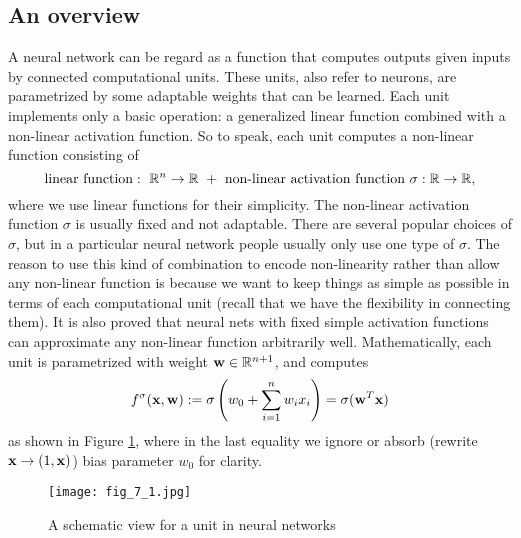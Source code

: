 \documentclass[../main.tex]{subfiles}
\begin{document}
\subsection{An overview}
A neural network can be regard as a function that computes outputs given inputs by connected computational units. These units, also refer to neurons, are parametrized by some adaptable weights that can be learned. Each unit implements only a basic operation: a generalized linear function combined with a non-linear activation function. So to speak, each unit computes a non-linear function consisting of
\begin{equation*}
{\rm linear\ function}:\ \mathbb{R}^n\rightarrow \mathbb{R}\ +\ \text{non-linear activation function}\ \sigma:\mathbb{R}\rightarrow \mathbb{R},
\end{equation*}
where we use linear functions for their simplicity. The non-linear activation function $\sigma$ is usually fixed and not adaptable. There are several popular choices of $\sigma$, but in a particular neural network people usually only use one type of $\sigma$. The reason to use this kind of combination to encode non-linearity rather than allow any non-linear function is because we want to keep things as simple as possible in terms of each computational unit (recall that we have the flexibility in connecting them). It is also proved that neural nets with fixed simple activation functions can approximate any non-linear function arbitrarily well. Mathematically, each unit is parametrized with weight ${\bf w}\in \mathbb{R}^{n+1}$, and computes
\begin{equation*}
f^{\sigma}({\bf x},{\bf w}):=\sigma\left(w_0+\sum_{i=1}^{n}w_ix_i\right)=\sigma({\bf w}^T{\bf x})
\end{equation*}
as shown in Figure \ref{fig_7_1}, where in the last equality we ignore or absorb (rewrite ${\bf x}\rightarrow (1,{\bf x})$) bias parameter $w_0$ for clarity.
\begin{figure}[h] 
	\centering 
	\texttt{[image: fig\_7\_1.jpg]} 
	\caption{A schematic view for a unit in neural networks}\label{fig_7_1}
\end{figure}
\end{document}
